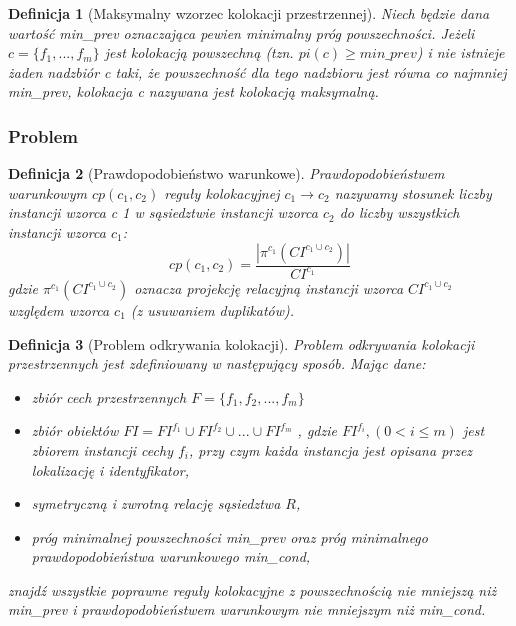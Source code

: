 \documentclass[12pt]{article}
\newtheorem{defin}{Definicja}
\begin{document}
\begin{defin}[Maksymalny wzorzec kolokacji przestrzennej]Niech będzie dana wartość min\_prev oznaczająca pewien minimalny próg powszechności. Jeżeli $ c = \{f_{1},...,f_{m} \} $ jest kolokacją powszechną (tzn. $ pi(c) \ge min\_prev $) i nie istnieje żaden nadzbiór c taki, że powszechność dla tego nadzbioru jest równa co najmniej min\_prev, kolokacja c nazywana jest kolokacją maksymalną.  
\end{defin}

\subsubsection{Problem}


\begin{defin}[Prawdopodobieństwo warunkowe]Prawdopodobieństwem warunkowym
$ cp(c_{1}, c_{2})$ reguły kolokacyjnej $ c_{1} \rightarrow c_{2} $ nazywamy stosunek liczby instancji wzorca c 1 w sąsiedztwie instancji wzorca $ c_{2}$ do liczby wszystkich instancji wzorca $ c_{1} $:
\begin{equation}
cp(c_{1}, c_{2}) = \frac{|\pi^{c_{1}}(CI^{c_{1} \cup c_{2}})|}{CI^{c_{1}}}
\end{equation}
gdzie $\pi^{c_{1}}(CI^{c_{1} \cup c_{2}})$ oznacza projekcję relacyjną instancji wzorca $CI^{c_{1} \cup c_{2}}$ względem wzorca $ c_{1} $ (z usuwaniem duplikatów).
\end{defin}

\begin{defin}[Problem odkrywania kolokacji]
Problem odkrywania kolokacji przestrzennych jest zdefiniowany w następujący sposób.
Mając dane:
\begin{itemize}
\item zbiór cech przestrzennych $F = \{ f_{1}, f_{2}, ...,f_{m} \} $
\item zbiór obiektów $FI = FI^{f_{1}} \cup FI^{f_{2}} \cup ... \cup FI^{f_{m}}$  , gdzie $ FI^{f_{i}},(0 < i \le m) $ jest zbiorem instancji cechy $ f_{i}$, przy czym każda instancja jest opisana przez lokalizację i identyfikator,
\item symetryczną i zwrotną relację sąsiedztwa $R$,
\item próg minimalnej powszechności min\_prev oraz próg minimalnego prawdopodobieństwa warunkowego min\_cond,
\end{itemize}
znajdź wszystkie poprawne reguły kolokacyjne z powszechnością nie mniejszą niż min\_prev i prawdopodobieństwem warunkowym nie mniejszym niż min\_cond.
\end{defin}
\end{document}
